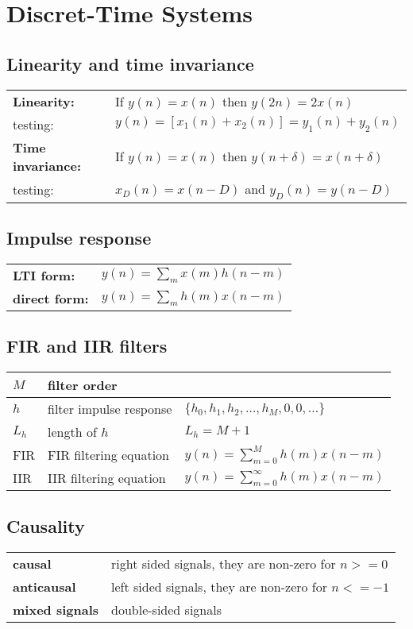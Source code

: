 \section{Discret-Time Systems}
\subsection{Linearity and time invariance}
\begin{tabular}{ll}
\textbf{Linearity:} & If $y(n) = x(n)$ then $y(2n)=2x(n)$\\
testing: & $y(n)=[x_1(n) + x_2(n)] = y_1(n) + y_2(n)$\\
\textbf{Time invariance:} & If $y(n) = x(n)$ then $y(n+\delta) = x(n+\delta)$\\
testing: & $x_D(n)=x(n-D)$ and $y_D(n)=y(n-D)$\\
\end{tabular}

\subsection{Impulse response}
\begin{tabular}{ll}
	\textbf{LTI form:}		& $y(n) = \sum\limits_m x(m)h(n-m)$ \\
	\textbf{direct form:}	& $y(n) = \sum\limits_m h(m)x(n-m)$
\end{tabular}


\subsection{FIR and IIR filters}
\begin{tabularx}{0.75\textwidth}{|l|X|X|}
	\hline
	$M$	& filter order				& 
	\\ \hline
	$h$	& filter impulse response	& $\{ h_0, h_1, h_2, \ldots , h_M, 0, 0, \ldots\}$
	\\ \hline
	$L_h$	& length of $h$			& $L_h = M + 1$
	\\ \hline
	FIR		& FIR filtering equation	& $y(n) = \sum\limits_{m=0}^{M} h(m)x(n-m)$
	\\ \hline
	IIR		& IIR filtering equation	& $y(n) = \sum\limits_{m=0}^{\infty} h(m)x(n-m)$
	\\ \hline
\end{tabularx}


\subsection{Causality}
\begin{tabular}{ll}
	\textbf{causal} & right sided signals, they are non-zero for $n>=0$ \\
	\textbf{anticausal} & left sided signals, they are non-zero for $n<=-1$ \\
	\textbf{mixed signals} & double-sided signals \\
\end{tabular}

